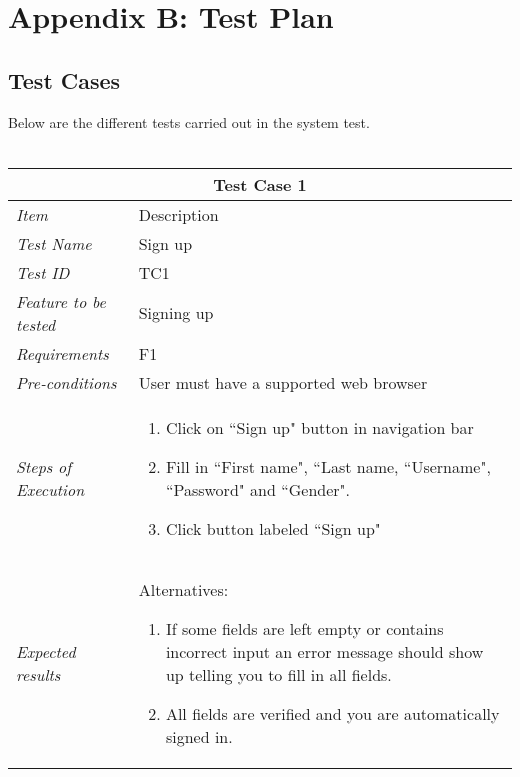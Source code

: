 


\chapter{Appendix B: Test Plan}
\label{chap:TestingTPlan}


\section{Test Cases}
\label{sec:TestCases}

Below are the different tests carried out in the system test. \\ \\
%
\begin{minipage}{\linewidth}
\setlength{\tabcolsep}{15pt}
\centering
{}
\begin{tabular}{ |l|p{70mm}| }
	\hline
	\multicolumn{2}{|c|}{\cellcolor{gray!25} \textbf{Test Case 1}} \\
	\hline
	\it{\cellcolor{gray!25}Item} & {\cellcolor{gray!25} Description } \\
	\hline
	\it{\cellcolor{gray!25}Test Name } & Sign up \\ \hline
	\it{\cellcolor{gray!25}Test ID} & TC1 \\ \hline
	\it{\cellcolor{gray!25}Feature to be tested} & Signing up \\ \hline
	\it{\cellcolor{gray!25}Requirements} & F1  \\ \hline
	\it{\cellcolor{gray!25}Pre-conditions} & User must have a supported web browser  \\ \hline
	\it{\cellcolor{gray!25}Steps of Execution} & \begin{enumerate}
	                                       \item Click on ``Sign up" button in navigation bar
	                                       \item Fill in ``First name", ``Last name, ``Username", ``Password" and ``Gender".
	                                       \item Click button labeled ``Sign up"
	                                     \end{enumerate} \\ \hline
	\it{\cellcolor{gray!25}Expected results} & Alternatives: 
	\begin{enumerate}[label=\alph*)]
	                                       \item If some fields are left empty or contains incorrect input an error message should show up telling you to fill in all fields.
	                                       \item All fields are verified and you are automatically signed in.
	                                     \end{enumerate} \\
	\hline
\end{tabular}
\medskip
\end{minipage}

